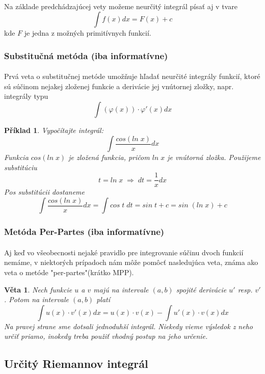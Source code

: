 \documentclass[12pt,a4paper]{article}
\newtheorem{sentence}{Věta}
\newtheorem{example}{Příklad}
\begin{document}
\paragraph{}
Na základe predchádzajúcej vety možeme neurčitý integrál písať aj v tvare $$\int f(x)dx=F(x)+c$$ kde $F$ je jedna z možných primitívnych funkcií.

\subsubsection{Substitučná metóda (iba informatívne)}
\paragraph{}
Prvá veta o substitučnej metóde umožňuje hľadať neurčité integrály funkcií, ktoré sú
súčinom nejakej zloženej funkcie a derivácie jej vnútornej zložky, napr. integrály typu $$\int (\varphi (x))\cdot \varphi '(x)dx$$

\begin{example}
	Vypočítajte integrál: $$\int \frac{cos(ln\; x)}{x}dx$$ Funkcia $cos(ln \; x)$ je zložená funkcia, pričom $ln \; x$ je vnútorná zložka. Použijeme substitúciu $$t=ln \; x \; \Rightarrow \; dt=\frac{1}{x}dx$$ Pos substitúcii dostaneme $$\int \frac{cos(ln\; x)}{x}dx = \int cos \;t \; dt = sin \;t + c=sin \; (ln \; x)+c$$
\end{example}

\subsubsection{Metóda Per-Partes (iba informatívne)}
\paragraph{}
Aj keď vo všeobecnosti nejaké pravidlo pre integrovanie súčinu dvoch funkcií nemáme, v niektorých prípadoch nám môže pomôcť nasledujúca veta, známa ako veta o metóde "per-partes"(krátko MPP).

\begin{sentence}
	Nech funkcie $u$ a $v$ majú na intervale $(a, b)$ spojité derivácie $u'$ resp. $v'$. Potom na intervale $(a, b)$ platí $$\int u(x) \cdot v'(x)dx = u(x) \cdot v(x) - \int u'(x)\cdot v(x) dx$$ Na pravej strane sme dotsali jednoduhší integrál. Niekedy vieme výsledok z neho určiť priamo, inokedy treba použiť vhodný postup na jeho určenie.
\end{sentence}

\subsection{Určitý Riemannov integrál}
\end{document}
